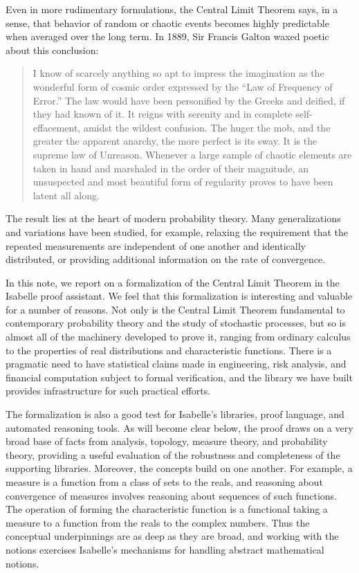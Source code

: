 \documentclass{article}
\begin{document}
Even in more rudimentary formulations, the Central Limit Theorem says, in a sense, that behavior of random or chaotic events becomes highly predictable when averaged over the long term. In 1889, Sir Francis Galton waxed poetic about this conclusion:
\begin{quote}
 I know of scarcely anything so apt to impress the imagination as the wonderful form of cosmic order expressed by the ``Law of Frequency of Error.'' The law would have been personified by the Greeks and deified, if they had known of it. It reigns with serenity and in complete self-effacement, amidst the wildest confusion. The huger the mob, and the greater the apparent anarchy, the more perfect is its sway. It is the supreme law of Unreason. Whenever a large sample of chaotic elements are taken in hand and marshaled in the order of their magnitude, an unsuspected and most beautiful form of regularity proves to have been latent all along. \cite[page 66]{galton:89}
\end{quote}
The result lies at the heart of modern probability theory. Many generalizations and variations have been studied, for example, relaxing the requirement that the repeated measurements are independent of one another and identically distributed, or providing additional information on the rate of convergence.

In this note, we report on a formalization of the Central Limit Theorem in the Isabelle proof assistant. We feel that this formalization is interesting and valuable for a number of reasons. Not only is the Central Limit Theorem fundamental to contemporary probability theory and the study of stochastic processes, but so is almost all of the machinery developed to prove it, ranging from ordinary calculus to the properties of real distributions and characteristic functions. There is a pragmatic need to have statistical claims made in engineering, risk analysis, and financial computation subject to formal verification, and the library we have built provides infrastructure for such practical efforts.

The formalization is also a good test for Isabelle's libraries, proof language, and automated reasoning tools. As will become clear below, the proof draws on a very broad base of facts from analysis, topology, measure theory, and probability theory, providing a useful evaluation of the robustness and completeness of the supporting libraries. Moreover, the concepts build on one another. For example, a measure is a function from a class of sets to the reals, and reasoning about convergence of measures involves reasoning about sequences of such functions. The operation of forming the characteristic function is a functional taking a measure to a function from the reals to the complex numbers. Thus the conceptual underpinnings are as deep as they are broad, and working with the notions exercises Isabelle's mechanisms for handling abstract mathematical notions.
\end{document}
